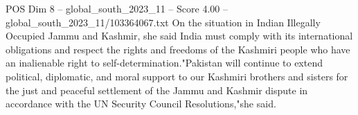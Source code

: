 \begin{textsample}{POS Dim 8 – global\_south\_2023\_11 – Score 4.00 – global\_south\_2023\_11/103364067.txt}
On the situation in Indian Illegally Occupied Jammu and Kashmir, she said India must comply with its international obligations and respect the rights and freedoms of the Kashmiri people who have an inalienable right to self-determination."Pakistan will continue to extend political, diplomatic, and moral support to our Kashmiri brothers and sisters for the just and peaceful settlement of the Jammu and Kashmir dispute in accordance with the UN Security Council Resolutions,"she said.

\end{textsample}
